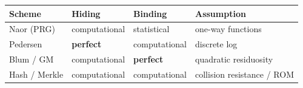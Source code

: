 \documentclass[11pt,a4paper]{report}
\theoremstyle{plain}
\theoremstyle{definition}
\theoremstyle{remark}
\begin{document}
\begin{center}
\small\renewcommand{\arraystretch}{1.25}
\begin{tabular}{@{}l L{2.5cm} L{2.6cm} L{3.6cm}@{}}
\toprule
\textbf{Scheme} & \textbf{Hiding} & \textbf{Binding} & \textbf{Assumption}\\
\midrule
Naor (PRG) & computational & statistical & one-way functions\\
Pedersen & \textbf{perfect} & computational & discrete log\\
Blum / GM & computational & \textbf{perfect} & quadratic residuosity\\
Hash / Merkle & computational & computational & collision resistance / ROM\\
\bottomrule
\end{tabular}
\end{center}

\end{document}
